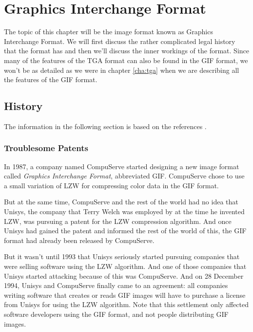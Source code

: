 \begin{comment}
  
\end{comment}

\chapter{Graphics Interchange Format}
\label{cha:gif}

The topic of this chapter will be the image format known as Graphics
Interchange Format. We will first discuss the rather complicated legal
history that the format has and then we'll discuss the inner workings
of the format. Since many of the features of the TGA format can also
be found in the GIF format, we won't be as detailed as we were in
chapter \ref{cha:tga} when we are describing all the features of the
GIF format.

\section{History}
\label{sec:gif-history}

The information in the following section is based on the references
\cite{welch85:_u,roelofs09:_histor_portab_networ_graph_png_format,battilana:_gif_contr,caie:_sad,roelofs99:_png}.


\subsection{Troublesome Patents}

\newcommand{\compus}{CompuServe\xspace}

In 1987, a company named \compus started designing a new image format
called \textit{Graphics Interchange Format}, abbreviated GIF. \compus
chose to use a small variation of LZW for compressing color data in
the GIF format.

But at the same time, \compus and the rest of the world had no idea
that Unisys, the company that Terry Welch was employed by at the time
he invented LZW, was pursuing a patent for the LZW compression
algorithm. And once Unisys had gained the patent and informed the rest
of the world of this, the GIF format had already been released by
\compus.

But it wasn't until 1993 that Unisys seriously started pursuing
companies that were selling software using the LZW algorithm. And one
of those companies that Unisys started attacking because of this was
\compus. And on 28 December 1994, Unisys and \compus finally came to
an agreement: all companies writing software that creates or reads GIF
images will have to purchase a license from Unisys for using the LZW
algorithm. Note that this settlement only affected software developers using the
GIF format, and not people distributing GIF images.

